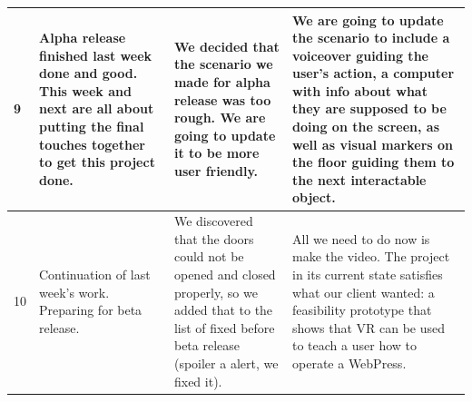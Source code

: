 \documentclass[onecolumn, draftclsnofoot,10pt, compsoc]{IEEEtran}
\begin{document}
\begin{longtable}{ |p{2cm}||p{5cm}|p{5cm}|p{5cm}|  }
\hline
 9 & Alpha release finished last week done and good. This week and next are all about putting the final touches together to get this project done.
     & We decided that the scenario we made for alpha release was too rough. We are going to update it to be more user friendly.
     & We are going to update the scenario to include a voiceover guiding the user's action, a computer with info about what they are supposed to be doing on the screen, as well as visual markers on the floor guiding them to the next interactable object.\\
\hline
 10 & Continuation of last week's work. Preparing for beta release.
      & We discovered that the doors could not be opened and closed properly, so we added that to the list of fixed before beta release (spoiler a alert, we fixed it).
      & All we need to do now is make the video. The project in its current state satisfies what our client wanted: a feasibility prototype that shows that VR can be used to teach a user how to operate a WebPress. \\
 \hline
\end{longtable}
\end{document}
